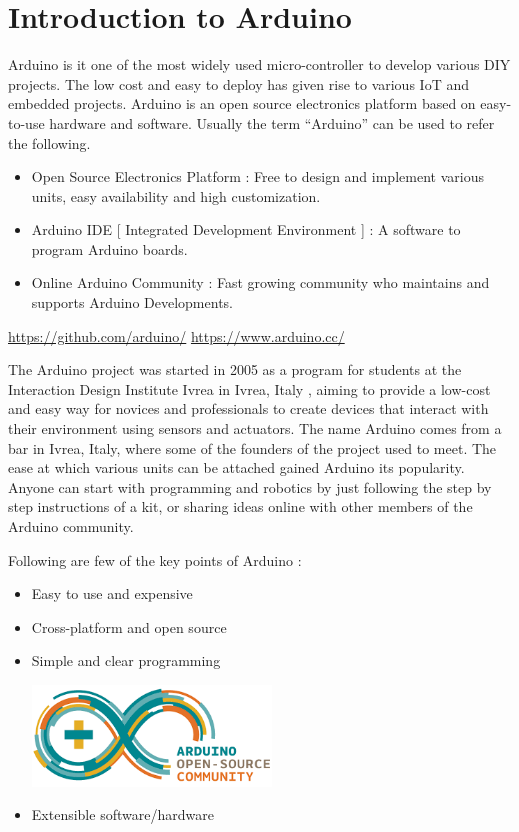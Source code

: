 \chapter{Introduction to Arduino}
\label{ch:arduino-uno}
Arduino is it one of the most widely used micro-controller to develop various DIY projects. The low cost and easy to deploy has given rise to various IoT and embedded projects. Arduino is an open source electronics platform based on easy-to-use hardware and software. Usually the term “Arduino” can be used to refer the following.
\begin{itemize}
    \item Open Source Electronics Platform : Free to design and implement various units, easy availability and high customization. 
    \item Arduino IDE [ Integrated Development Environment ] : A software to program Arduino boards.
    \item Online Arduino Community : Fast growing community who maintains and supports Arduino Developments.

\end{itemize}

\url{https://github.com/arduino/} \hspace{0.5cm} \url{https://www.arduino.cc/}

\par The Arduino project was started in 2005 as a program for students at the Interaction Design Institute Ivrea in Ivrea, Italy , aiming to provide a low-cost and easy way for novices and professionals to create devices that interact with their environment using sensors and actuators. The name Arduino comes from a bar in Ivrea, Italy, where some of the founders of the project used to meet. The ease at which various units can be attached gained Arduino its popularity. Anyone can start with programming and robotics by just following the step by step instructions of a kit, or sharing ideas online with other members of the Arduino community.

Following are few of the key points of Arduino :

\begin{itemize}
    \item Easy to use and expensive
    \item Cross-platform and open source
    \item Simple and clear programming
    \begin{marginfigure}
    \hspace{-1.5in}\includegraphics[width=2.5in]{Chapters/images/Arduino_opensource.png}
    \end{marginfigure} 
    \item  Extensible software/hardware
\end{itemize}   

